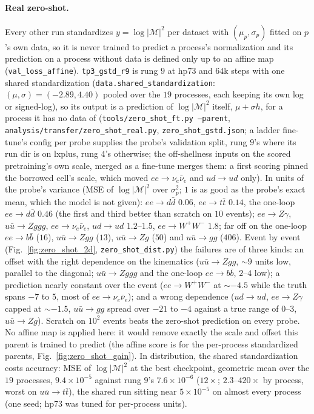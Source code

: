 \documentclass[11pt]{article}
\newcommand{\code}[1]{\texttt{#1}}
\begin{document}
\paragraph{Real zero-shot.} Every other run standardizes $y=\log|\mathcal M|^2$ per dataset with $(\mu_p,\sigma_p)$
fitted on $p$'s own data, so it is never trained to predict a process's normalization and its prediction on a process
without data is defined only up to an affine map (\code{val\_loss\_affine}). \code{tp3\_gstd\_r9} is rung $9$ at hp73 and $64$k steps with one shared standardization
(\code{data.shared\_standardization}: $(\mu,\sigma)=(-2.89,4.40)$ pooled over the $19$ processes, each keeping its own
log or signed-log), so its output is a prediction of $\log|\mathcal M|^2$ itself, $\mu+\sigma h$, for a process it has
no data of (\code{tools/zero\_shot\_ft.py --parent}, \code{analysis/transfer/zero\_shot\_real.py},
\code{zero\_shot\_gstd.json}; a ladder fine-tune's config per probe supplies the probe's validation split, rung $9$'s
where its run dir is on lxplus, rung $4$'s otherwise; the off-shellness inputs on the scored pretraining's own scale, merged as a fine-tune merges
them: a first scoring pinned the borrowed cell's scale, which moved $ee\to\nu_e\bar\nu_e$ and $ud\to ud$ only). In units of the probe's variance (MSE of $\log|\mathcal M|^2$ over
$\sigma_p^2$; $1$ is as good as the probe's exact mean, which the model is not given): $ee\to d\bar d$ $0.06$,
$ee\to t\bar t$ $0.14$, the one-loop $ee\to d\bar d$ $0.46$ (the first and third better than scratch on $10$ events);
$ee\to Z\gamma$, $u\bar u\to Zggg$, $ee\to\nu_e\bar\nu_e$, $ud\to ud$ $1.2$--$1.5$, $ee\to W^+W^-$ $1.8$;
far off on the one-loop $ee\to b\bar b$ ($16$), $u\bar u\to Zgg$ ($13$), $u\bar u\to Zg$ ($50$) and $u\bar u\to gg$
($406$). Event by event (Fig.~\ref{fig:zero_shot_2d}, \code{zero\_shot\_dist.py}) the failures are of three kinds:
an offset with the right dependence on the kinematics ($u\bar u\to Zgg$, $\sim9$ units low, parallel to the diagonal;
$u\bar u\to Zggg$ and the one-loop $ee\to b\bar b$, $2$--$4$ low); a prediction nearly constant over the event
($ee\to W^+W^-$ at $\sim-4.5$ while the truth spans $-7$ to $5$, most of $ee\to\nu_e\bar\nu_e$); and a wrong dependence
($ud\to ud$, $ee\to Z\gamma$ capped at $\sim-1.5$, $u\bar u\to gg$ spread over $-21$ to $-4$ against a true range of
$0$--$3$, $u\bar u\to Zg$). Scratch on $10^2$ events beats the zero-shot prediction on every probe. No affine map is
applied here: it would remove exactly the scale and offset this parent is trained to predict (the affine score is for
the per-process standardized parents, Fig.~\ref{fig:zero_shot_gain}). In distribution, the shared standardization costs
accuracy: MSE of $\log|\mathcal M|^2$ at the best checkpoint, geometric mean over the $19$ processes, $9.4\times10^{-5}$
against rung $9$'s $7.6\times10^{-6}$ ($12\times$; $2.3$--$420\times$ by process, worst on $u\bar u\to t\bar t$), the
shared run sitting near $5\times10^{-5}$ on almost every process (one seed; hp73 was tuned for per-process units).
\end{document}
